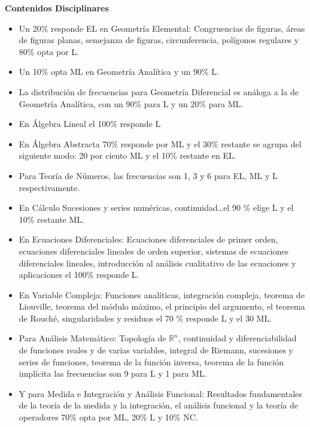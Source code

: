 \documentclass[a4paper,10pt,BCOR10mm,oneside,headsepline]{scrbook}
\begin{document}
\noindent\textbf{Contenidos Disciplinares}

\begin{itemize}
\item Un 20\% responde EL en Geometría Elemental: Congruencias de figuras, áreas de figuras planas, semejanza de figuras, circunferencia, polígonos regulares y 80\% opta por L.

\item Un 10\% opta ML en Geometría Analítica y un 90\% L.

\item La distribución de frecuencias para Geometría Diferencial es análoga a la de Geometría Analítica, con un 90\% para L y un 20\% para ML.


\item En Álgebra Lineal el 100\% responde L

\item  En Álgebra Abstracta 70\% responde por ML y el 30\% restante se agrupa del siguiente modo: 20 por ciento ML y el 10\% restante en EL.

\item Para Teoría de Números, las frecuencias son 1, 3 y 6 para EL, ML y L respectivamente.

\item En Cálculo Sucesiones y series numéricas, continuidad…el 90 \% elige L y el 10\% restante ML.

\item En Ecuaciones Diferenciales: Ecuaciones diferenciales de primer orden, ecuaciones diferenciales lineales de orden superior, sistemas de ecuaciones diferenciales lineales, introducción al análisis cualitativo de las ecuaciones y aplicaciones el 100\% responde L.

\item En Variable Compleja: Funciones analíticas, integración compleja, teorema de Liouville, teorema del módulo máximo, el principio del argumento, el teorema de Rouché, singularidades y residuos el 70 \% responde L y el 30 ML.

\item Para Análisis Matemático: Topología de $\mathbb{R}^n$, continuidad y diferenciabilidad de funciones reales y de varias variables, integral de Riemann, sucesiones y series de funciones, teorema de la función inversa, teorema de la función implícita las frecuencias son 9 para L y 1 para ML.

\item Y para Medida e Integración y Análisis Funcional: Resultados fundamentales de la teoría de la medida y la integración, el análisis funcional y la teoría de operadores 70\% opta por ML, 20\% L y 10\% NC.


\end{itemize}
\end{document}
